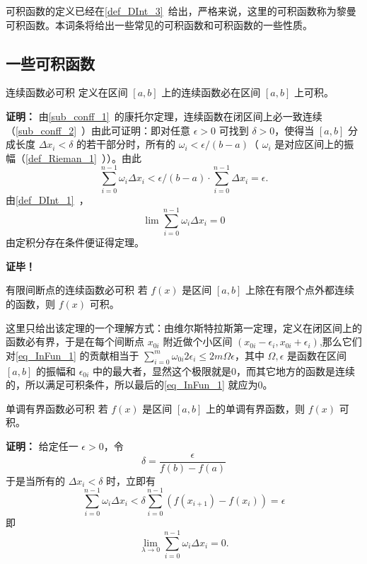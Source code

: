 
\begin{issues}
\end{issues}

可积函数的定义已经在\autoref{def_DInt_3}~给出，严格来说，这里的可积函数称为黎曼可积函数。本词条将给出一些常见的可积函数和可积函数的一些性质。
\subsection{一些可积函数}
\begin{theorem}{连续函数必可积}
定义在区间 $[a,b]$ 上的连续函数必在区间 $[a,b]$ 上可积。
\end{theorem}
\textbf{证明：}
由\autoref{sub_conff_1}~的康托尔定理，连续函数在闭区间上必一致连续（\autoref{sub_conff_2}~）由此可证明：即对任意 $\epsilon>0$ 可找到 $\delta>0$，使得当 $[a,b]$ 分成长度 $\Delta x_i<\delta$ 的若干部分时，所有的 $\omega_i<\epsilon/(b-a)$（ $\omega_i$ 是对应区间上的振幅（\autoref{def_Rieman_1}~））。由此
\begin{equation}
\sum_{i=0}^{n-1}\omega_i\Delta x_i<\epsilon/(b-a)\cdot\sum_{i=0}^{n-1}\Delta x_i=\epsilon.
\end{equation}
由\autoref{def_DInt_1}~，
\begin{equation}\label{eq_InFun_1}
\lim\sum_{i=0}^{n-1}\omega_i\Delta x_i=0
\end{equation}
由定积分存在条件便证得定理。

\textbf{证毕！}

\begin{theorem}{有限间断点的连续函数必可积}
若 $f(x)$ 是区间 $[a,b]$ 上除在有限个点外都连续的函数，则 $f(x)$ 可积。
\end{theorem}
这里只给出该定理的一个理解方式：由维尔斯特拉斯第一定理，定义在闭区间上的函数必有界，于是在每个间断点 $x_{0i}$ 附近做个小区间 $(x_{0i}-\epsilon_i,x_{0i}+\epsilon_i)$,那么它们对\autoref{eq_InFun_1} 的贡献相当于 $\sum_{i=0}^{m}\omega_{0i}2\epsilon_i\leq2m\Omega\epsilon $，其中 $\Omega,\epsilon$ 是函数在区间 $[a,b]$ 的振幅和 $\epsilon_{0i}$ 中的最大者，显然这个极限就是0，而其它地方的函数是连续的，所以满足可积条件，所以最后的\autoref{eq_InFun_1} 就应为0。 

\begin{theorem}{单调有界函数必可积}
若 $f(x)$ 是区间 $[a,b]$ 上的单调有界函数，则 $f(x)$ 可积。
\end{theorem}
\textbf{证明：}
给定任一 $\epsilon>0$，令 
\begin{equation}
\delta=\frac{\epsilon}{f(b)-f(a)}
\end{equation}
于是当所有的 $\Delta x_i<\delta$ 时，立即有
\begin{equation}
\sum_{i=0}^{n-1}\omega_i\Delta x_i<\delta\sum_{i=0}^{n-1}(f(x_{i+1})-f(x_i))=\epsilon
\end{equation}
即 
\begin{equation}
\lim_{\lambda\rightarrow0}\sum_{i=0}^{n-1}\omega_i\Delta x_i=0.
\end{equation}

